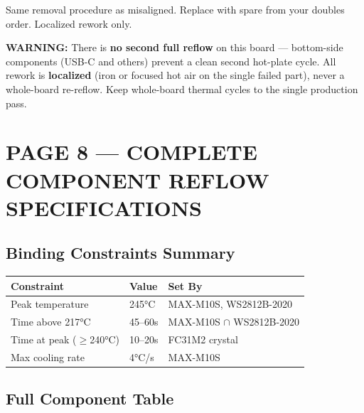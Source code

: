 \documentclass[11pt,a4paper]{article}
\newcommand{\dangerbox}[1]{\par\noindent\colorbox{danger!10}{\parbox{\dimexpr\textwidth-2\fboxsep}{%
\textcolor{danger}{\textbf{WARNING:}} #1}}\par\vspace{0.5em}}
\begin{document}
Same removal procedure as misaligned. Replace with spare from your doubles order. Localized rework only.

\dangerbox{There is \textbf{no second full reflow} on this board — bottom-side components (USB-C and others) prevent a clean second hot-plate cycle. All rework is \textbf{localized} (iron or focused hot air on the single failed part), never a whole-board re-reflow. Keep whole-board thermal cycles to the single production pass.}

\newpage
\section*{PAGE 8 — COMPLETE COMPONENT REFLOW SPECIFICATIONS}

\subsection*{Binding Constraints Summary}

\begin{table}[H]
\centering
\begin{tabular}{@{}lll@{}}
\toprule
\textbf{Constraint} & \textbf{Value} & \textbf{Set By} \\
\midrule
Peak temperature & 245°C & MAX-M10S, WS2812B-2020 \\
Time above 217°C & 45--60s & MAX-M10S $\cap$ WS2812B-2020 \\
Time at peak ($\geq$240°C) & 10--20s & FC31M2 crystal \\
Max cooling rate & 4°C/s & MAX-M10S \\
\bottomrule
\end{tabular}
\end{table}

\subsection*{Full Component Table}
\end{document}
